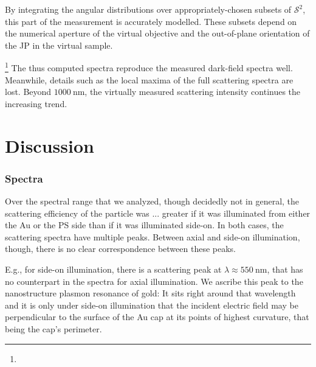 \documentclass[10pt]{article}
\begin{document}
\begin{multicols}{2}
By integrating the angular distributions over appropriately-chosen subsets of $\mathcal{S}^2$, this part of the measurement is accurately modelled. 
These subsets depend on the numerical aperture of the virtual objective and the out-of-plane orientation of the JP in the virtual sample. 

\footnote{} 
The thus computed spectra reproduce the measured dark-field spectra well. 
Meanwhile, details such as the local maxima of the full scattering spectra are lost. 
Beyond $\SI{1000}{\nano\meter}$, the virtually measured scattering intensity continues the increasing trend.  







\section*{Discussion}

\subsubsection*{Spectra}

Over the spectral range that we analyzed, though decidedly not in general, the scattering efficiency of the particle was ... greater if it was illuminated from either the Au or the PS side than if it was illuminated side-on. 
In both cases, the scattering spectra have multiple peaks. 
Between axial and side-on illumination, though, there is no clear correspondence between these peaks. 

E.g., for side-on illumination, there is a scattering peak at $\lambda\approx\SI{550}{\nano\meter}$, that has no counterpart in the spectra for axial illumination. 
We ascribe this peak to the nanostructure plasmon resonance of gold: 
It sits right around that wavelength and it is only under side-on illumination that the incident electric field may be perpendicular to the surface of the Au cap at its points of highest curvature, that being the cap's perimeter. 


\end{multicols}
\end{document}
